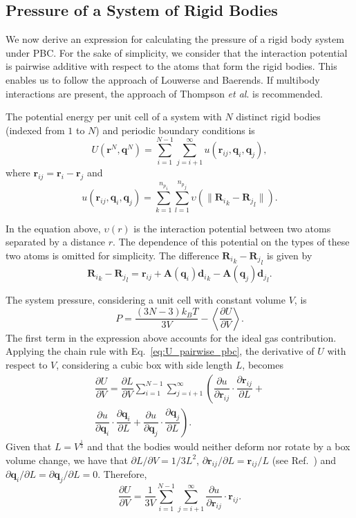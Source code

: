 \documentclass[aip,jcp,reprint,amsmath,amssymb,raggedbottom]{revtex4-1}
\newcommand{\mt}[1]{\boldsymbol{\mathbf{#1}}}           %
\newcommand{\vt}[1]{\boldsymbol{\mathbf{#1}}}           %
\newcommand{\diff}[2]{\dfrac{\partial #1}{\partial #2}} %
\begin{document}
\subsection{Pressure of a System of Rigid Bodies}
\label{sec:pressure}

We now derive an expression for calculating the pressure of a rigid body system under PBC. For the sake of simplicity, we consider that the interaction potential is pairwise additive with respect to the atoms that form the rigid bodies. This enables us to follow the approach of Louwerse and Baerends.\cite{Louwerse2006} If multibody interactions are present, the approach of Thompson \textit{et al}.\cite{Thompson2009} is recommended.

The potential energy per unit cell of a system with $N$ distinct rigid bodies (indexed from $1$ to $N$) and periodic boundary conditions is
\begin{equation}
\label{eq:U_pairwise_pbc}
U({\vt r}^N, {\vt q}^N) = \sum_{i=1}^{N-1} \sum_{j=i+1}^{\infty} u({\vt r}_{ij},{\vt q}_i,{\vt q}_j),
\end{equation}
where ${\vt r}_{ij} = {\vt r}_i - {\vt r}_j$ and
\begin{equation}
\label{eq:u_rigid_body_pair}
u({\vt r}_{ij},{\vt q}_i,{\vt q}_j) = \sum_{k=1}^{{n_p}_i} \sum_{l=1}^{{n_p}_j} \upsilon \left( \|{{\vt R}_i}_k - {{\vt R}_j}_l\| \right).
\end{equation}

In the equation above, $\upsilon(r)$ is the interaction potential between two atoms separated by a distance $r$. The dependence of this potential on the types of these two atoms is omitted for simplicity. The difference ${{\vt R}_i}_k - {{\vt R}_j}_l$ is given by
\[
{{\vt R}_i}_k - {{\vt R}_j}_l = {\vt r}_{ij} + {\mt A}({\vt q}_i){{\vt d}_i}_k - {\mt A}({\vt q}_j){{\vt d}_j}_l.
\]

The system pressure, considering a unit cell with constant volume $V$, is\cite{Louwerse2006,Tuckerman2010}
\[
P = \frac{(3N-3) k_B T}{3V} - \left\langle \diff{U}{V} \right\rangle.
\]
The first term in the expression above accounts for the ideal gas contribution. Applying the chain rule with Eq.~\ref{eq:U_pairwise_pbc}, the derivative of $U$ with respect to $V$, considering a cubic box with side length $L$, becomes
\begin{equation}
\begin{split}
\diff{U}{V} = \diff{L}{V} \sum_{i=1}^{N-1} \sum_{j=i+1}^{\infty} \left( \diff{u}{{\vt r}_{ij}} \cdot \diff{{\vt r}_{ij}}{L} + \right. \\ \left. \diff{u}{{\vt q}_i} \cdot \diff{{\vt q}_i}{L} + \diff{u}{{\vt q}_j} \cdot \diff{{\vt q}_j}{L}\right).
\end{split}
\end{equation}
Given that $L = V^\frac{1}{3}$ and that the bodies would neither deform nor rotate by a box volume change, we have that $\partial L / \partial V = 1/3L^2$, $\partial {\vt r}_{ij}/\partial L = {\vt r}_{ij}/L$ (see Ref.~) and $\partial {\vt q}_i / \partial L = \partial {\vt q}_j / \partial L = 0$. Therefore,
\[
\diff{U}{V} = \frac{1}{3V} \sum_{i=1}^{N-1} \sum_{j=i+1}^{\infty} \diff{u}{{\vt r}_{ij}} \cdot {\vt r}_{ij}.
\]
\end{document}
